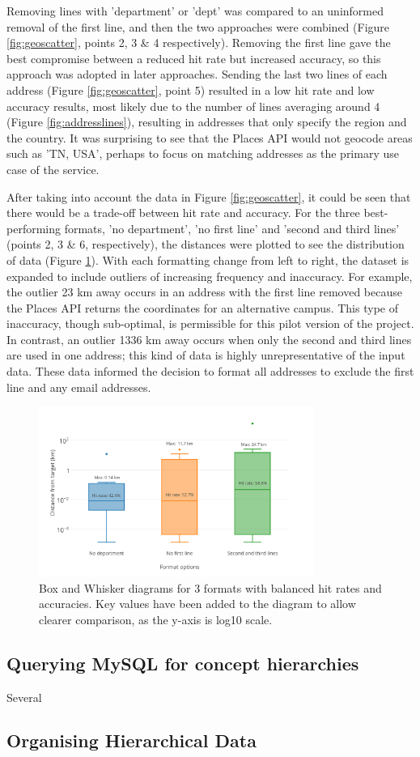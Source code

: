 \documentclass[Report.tex]{subfiles}
\begin{document}
\noindent Removing lines with 'department' or 'dept' was compared to an uninformed removal of the first line, and then the two approaches were combined (Figure \ref{fig:geoscatter}, points 2, 3 \& 4 respectively). Removing the first line gave the best compromise between a reduced hit rate but increased accuracy, so this approach was adopted in later approaches. Sending the last two lines of each address (Figure \ref{fig:geoscatter}, point 5) resulted in a low hit rate and low accuracy results, most likely due to the number of lines averaging around 4 (Figure \ref{fig:addresslines}), resulting in addresses that only specify the region and the country. It was surprising to see that the Places API would not geocode areas such as 'TN, USA', perhaps to focus on matching addresses as the primary use case of the service.\newline

\noindent After taking into account the data in Figure \ref{fig:geoscatter}, it could be seen that there would be a trade-off between hit rate and accuracy. For the three best-performing formats, 'no department', 'no first line' and 'second and third lines' (points 2, 3 \& 6, respectively), the distances were plotted to see the distribution of data (Figure \ref{fig:geoboxes}). With each formatting change from left to right, the dataset is expanded to include outliers of increasing frequency and inaccuracy. For example, the outlier 23 km away occurs in an address with the first line removed because the Places API returns the coordinates for an alternative campus. This type of inaccuracy, though sub-optimal, is permissible for this pilot version of the project. In contrast, an outlier 1336 km away occurs when only the second and third lines are used in one address; this kind of data is highly unrepresentative of the input data. These data informed the decision to format all addresses to exclude the first line and any email addresses.

\begin{figure}[!ht]
\begin{center}
	\includegraphics[width=0.8\textwidth]{../lib/images/distance-boxes}
	\caption{Box and Whisker diagrams for 3 formats with balanced hit rates and accuracies. Key values have been added to the diagram to allow clearer comparison, as the y-axis is log10 scale.\label{fig:geoboxes}}
\end{center}
\end{figure}

\subsection{Querying MySQL for concept hierarchies}
Several 

\subsection{Organising Hierarchical Data}
\end{document}
